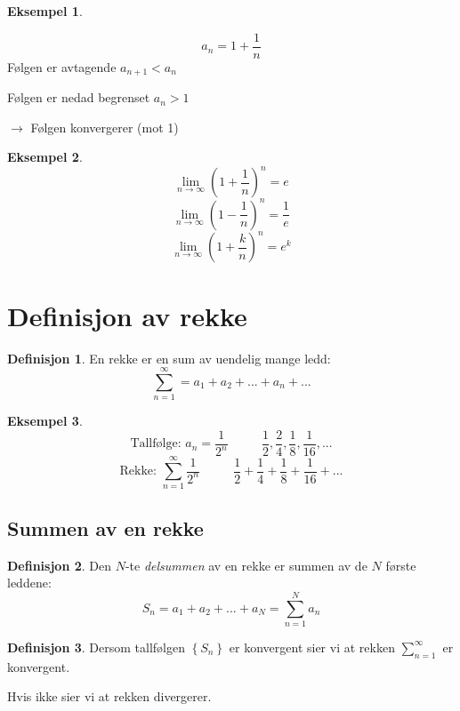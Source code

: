 \documentclass[11pt]{article}
\theoremstyle{definition}
\newtheorem{mindef}{Definisjon}[section]
\newenvironment{fmindef}
{\begin{mdframed}[style=minstil]\begin{mindef}}
		{\end{mindef}\end{mdframed}}
\theoremstyle{definition}
\newtheorem{mitteks}{Eksempel}[section]
\theoremstyle{definition}
\theoremstyle{definition}
\theoremstyle{definition}
\theoremstyle{definition}
\begin{document}
		\begin{mitteks}
\begin{flushleft}
				\[a_n=1+\dfrac{1}{n}\]
			Følgen er avtagende \(a_{n+1}<a_n\)		
				
			Følgen er nedad begrenset \(a_n>1\)
			
			\(\rightarrow\) Følgen konvergerer (mot 1)
\end{flushleft}
		\end{mitteks}
		
		\begin{mitteks}
			\[\lim\limits_{n\rightarrow \infty}\left(1+\dfrac{1}{n}\right)^{n}=e\]
			\[\lim\limits_{n\rightarrow \infty}\left(1-\dfrac{1}{n}\right)^{n}=
			\frac{1}{e}\]
			\[\lim\limits_{n\rightarrow \infty}\left(1+\dfrac{k}{n}\right)^{n}=e^k\]
		\end{mitteks}
		
		\newpage
		
		\section{Definisjon av rekke}
		
		\begin{fmindef}
			En rekke er en sum av uendelig mange ledd:
			\[\sum_{n=1}^{\infty }=a_1+a_2+...+a_n+... \]
		\end{fmindef}
		
		\begin{mitteks}
			\[\text{Tallfølge: } a_n=\dfrac{1}{2^n}\hspace{32pt} \dfrac{1}{2},\dfrac{2}{4},\dfrac{1}{8},\dfrac{1}{16},...\]
			\[\text{Rekke: }\sum_{n=1}^{\infty} \dfrac{1}{2^n} \hspace{32pt}\dfrac{1}{2}+\dfrac{1}{4}+\dfrac{1}{8}+\dfrac{1}{16}+... \]
		\end{mitteks}
		
		\subsection{Summen av en rekke}
		\begin{fmindef}
			Den \(N\)-te \textit{delsummen} av en rekke er summen av de \(N\) første leddene:
			\[S_n=a_1+a_2+...+a_N=\sum_{n=1}^{N}a_n\]
		\end{fmindef}
		
		\begin{fmindef}
			Dersom tallfølgen \(\left\lbrace S_n\right\rbrace \) er konvergent sier vi at rekken \(\sum_{n=1}^{\infty}\) er konvergent. 
			
			Hvis ikke sier vi at rekken divergerer.
		\end{fmindef}
		\newpage
		
\end{document}
